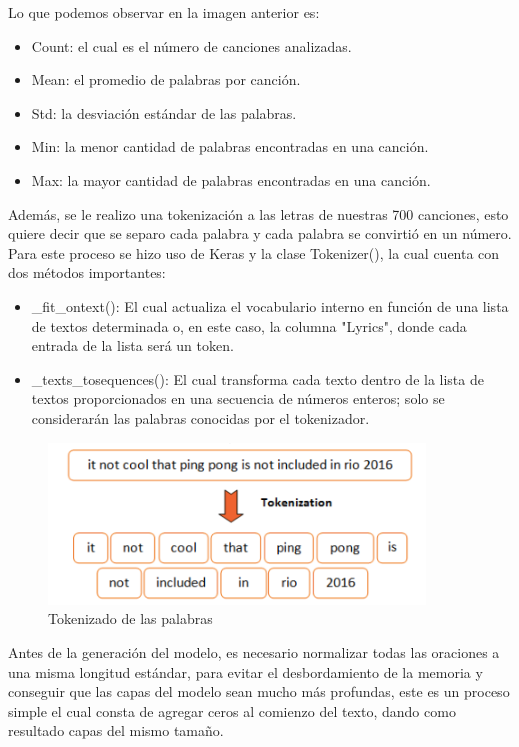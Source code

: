 \documentclass[12pt, a4paper, titlepage]{article}
\begin{document}
	Lo que podemos observar en la imagen anterior es:
	\begin{itemize}
		\item Count: el cual es el número de canciones analizadas.
		\item Mean: el promedio de palabras por canción.
		\item Std: la desviación estándar de las palabras.
		\item Min: la menor cantidad de palabras encontradas en una canción.
		\item Max: la mayor cantidad de palabras encontradas en una canción.
	\end{itemize}
	Además, se le realizo una tokenización a las letras de nuestras 700 canciones, esto quiere decir que se separo cada palabra y cada palabra se convirtió en un número. Para este proceso se hizo uso de Keras y la clase Tokenizer(), la cual cuenta con dos métodos importantes:
	\begin{itemize}
		\item \_fit\_ontext(): El cual actualiza el vocabulario interno en función de una lista de textos determinada o, en este caso, la columna "Lyrics", donde cada entrada de la lista será un token.
		\item \_texts\_tosequences(): El cual transforma cada texto dentro de la lista de textos proporcionados en una secuencia de números enteros; solo se considerarán las palabras conocidas por el tokenizador.
	\end{itemize}	
	\begin{figure}[H]
		\includegraphics[width=10cm]{./Imagenes/Modelo/tokenization.png}
		\centering 
		\caption{Tokenizado de las palabras \cite{tokenimagen}}
	\end{figure}
	Antes de la generación del modelo, es necesario normalizar todas las oraciones a una misma longitud estándar, para evitar el desbordamiento de la memoria y conseguir que las capas del modelo sean mucho más profundas, este es un proceso simple el cual consta de agregar ceros al comienzo del texto, dando como resultado capas del mismo tamaño.\\\\
\end{document}
